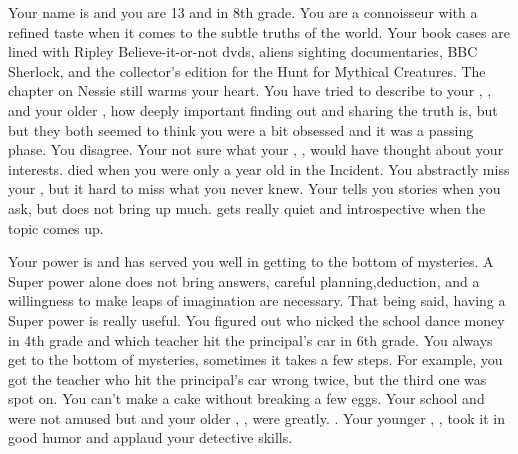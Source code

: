 \documentclass[char]{LRSguildcamp1}
\begin{document}
\name{\cTween{}}



Your name is \cTween{\intro} and you are 13 and in 8th grade. You are a connoisseur with a refined taste when it comes to the subtle truths of the world. Your book cases are lined with Ripley Believe-it-or-not dvds, aliens sighting documentaries,  BBC Sherlock, and the collector's edition for the Hunt for Mythical Creatures. The chapter on Nessie still warms your heart. You have tried to describe to your \cArchitect{\parent}, \cArchitect{}, and your older \cTeen{\sibling}, \cTeen{} how deeply important finding out and sharing the truth is, but but they both seemed to think you were a bit obsessed and it was a passing phase.
You disagree. Your not sure what your \cAS{\parent}, \cAS{}, would have thought about your interests. \cAS{\they} died when you were only a year old in the \pCityO{} Incident. You abstractly miss your \cAS{\parent}, but it hard to miss what you never knew. Your \cArchitect{\parent} tells you stories when you ask, but does not bring \cAS{\them} up much. \cTeen{} gets really quiet and introspective when the topic comes up. 

Your power is \cTween{\MYsuperpower} and has served you well in getting to the bottom of mysteries. A Super power alone does not bring answers, careful planning,deduction, and a willingness to make leaps of imagination are necessary. That being said, having a Super power is really useful. You figured out who nicked the school dance money in 4th grade and which teacher hit the principal's car in 6th grade. You always get to the bottom of mysteries, sometimes it takes a few steps. For example, you got the teacher who hit the principal's car wrong twice, but the third one was spot on. You can't make a cake without breaking a few eggs. Your school and \cArchitect{\parent} were not amused but \cGrandma{} and your older \cOldest{\uncle}, \cOldest{}, were greatly. \cYoungest{}. Your younger \cYoungest{\uncle}, \cYoungest{}, took it in good humor and applaud your detective skills.
\end{document}
